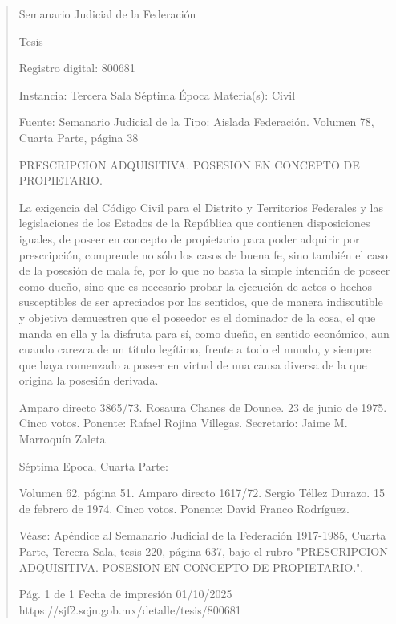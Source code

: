 \documentclass[11pt,a4paper]{article}
\begin{document}
\begin{quote}
                                                   Semanario Judicial de la Federación

                                                  Tesis

 Registro digital: 800681

 Instancia: Tercera Sala          Séptima Época                        Materia(s): Civil

                                  Fuente: Semanario Judicial de la     Tipo: Aislada
                                  Federación.
                                  Volumen 78, Cuarta Parte, página
                                  38


PRESCRIPCION ADQUISITIVA. POSESION EN CONCEPTO DE PROPIETARIO.


La exigencia del Código Civil para el Distrito y Territorios Federales y las legislaciones de los
Estados de la República que contienen disposiciones iguales, de poseer en concepto de propietario
para poder adquirir por prescripción, comprende no sólo los casos de buena fe, sino también el caso
de la posesión de mala fe, por lo que no basta la simple intención de poseer como dueño, sino que
es necesario probar la ejecución de actos o hechos susceptibles de ser apreciados por los sentidos,
que de manera indiscutible y objetiva demuestren que el poseedor es el dominador de la cosa, el
que manda en ella y la disfruta para sí, como dueño, en sentido económico, aun cuando carezca de
un título legítimo, frente a todo el mundo, y siempre que haya comenzado a poseer en virtud de una
causa diversa de la que origina la posesión derivada.


Amparo directo 3865/73. Rosaura Chanes de Dounce. 23 de junio de 1975. Cinco votos. Ponente:
Rafael Rojina Villegas. Secretario: Jaime M. Marroquín Zaleta

Séptima Epoca, Cuarta Parte:

Volumen 62, página 51. Amparo directo 1617/72. Sergio Téllez Durazo. 15 de febrero de 1974.
Cinco votos. Ponente: David Franco Rodríguez.

Véase: Apéndice al Semanario Judicial de la Federación 1917-1985, Cuarta Parte, Tercera Sala,
tesis 220, página 637, bajo el rubro "PRESCRIPCION ADQUISITIVA. POSESION EN CONCEPTO
DE PROPIETARIO.".




                                             Pág. 1 de 1             Fecha de impresión 01/10/2025
  https://sjf2.scjn.gob.mx/detalle/tesis/800681

\end{quote}
\end{document}
